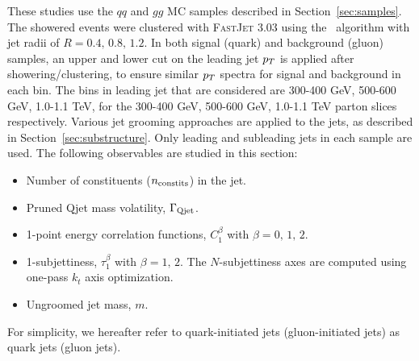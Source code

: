 These studies use the $qq$ and $gg$ MC samples described  in Section~\ref{sec:samples}. 
The showered events were clustered with \textsc{FastJet}
3.03 using
the \antikt~algorithm with jet radii of $R = 0.4,\, 0.8,\, 1.2$. In
both signal (quark) and background (gluon) samples, an upper and lower cut on
the leading jet $p_T$ is applied after showering/clustering, to ensure
similar $p_T$ spectra for signal and background in each \pt bin. The bins
in leading jet \pt that are considered are 300-400 GeV, 500-600 GeV,
1.0-1.1 TeV, for the 300-400 GeV, 500-600 GeV,
1.0-1.1 TeV parton \pt slices respectively. 
Various jet grooming approaches are applied to the jets, as described in Section~\ref{sec:substructure}. 
Only leading and subleading jets in each sample are used. The
following observables are studied in this section:
%
\begin{itemize}
\item Number of constituents ($n_{\rm constits}$) in the jet.
\item Pruned Qjet mass volatility, $\Gamma_{\rm Qjet}$.
\item 1-point energy correlation functions, $C_1^{\beta}$ with $\beta=0,\,1,\,2$.
\item 1-subjettiness, $\tau_1^{\beta}$ with $\beta=1,\,2$. The $N$-subjettiness axes are computed using one-pass $k_t$ axis optimization.
\item Ungroomed jet mass,  $m$.
\end{itemize}
%
For simplicity, we hereafter refer to quark-initiated jets (gluon-initiated jets) as quark jets (gluon jets).

